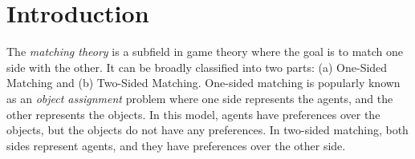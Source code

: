 \documentclass[a4paper,11pt,table]{article}
\theoremstyle{definition}
\theoremstyle{remark}
\begin{document}





\section{Introduction}
The \textit{matching theory} is a subfield in game theory where the goal is to match one side with the other. It can be broadly classified into two parts: (a) One-Sided Matching and (b) Two-Sided Matching. One-sided
matching is popularly known as an \textit{object assignment} problem where one side represents the agents, and the other represents the objects. In this model, agents have preferences over the objects, but the objects do not have any preferences. In two-sided matching, both sides represent agents, and they have preferences over the other side.
\\
\end{document}
